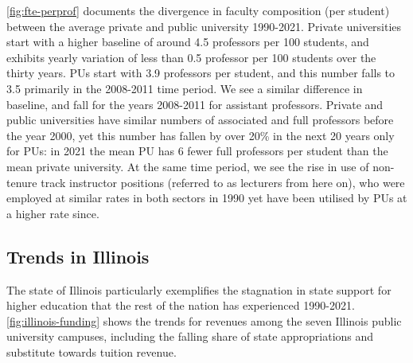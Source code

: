 \documentclass[notitlepage,12pt]{article}
\begin{document}
\autoref{fig:fte-perprof} documents the divergence in faculty composition (per student) between the average private and public university 1990-2021.
Private universities start with  a higher baseline of around 4.5 professors per 100 students, and exhibits yearly variation of less than 0.5 professor per 100 students over the thirty years.
PUs start with 3.9 professors per student, and this number falls to 3.5 primarily in the 2008-2011 time period.
We see a similar difference in baseline, and fall for the years 2008-2011 for assistant professors.
Private and public universities have similar numbers of associated and full professors before the year 2000, yet this number has fallen by over 20\% in the next 20 years only for PUs: in 2021 the mean PU has 6 fewer full professors per student than the mean private university.
At the same time period, we see the rise in use of non-tenure track instructor positions (referred to as lecturers from here on), who were employed at similar rates in both sectors in 1990 yet have been utilised by PUs at a higher rate since.

\subsection{Trends in Illinois}
\label{sec:trends-illinois}

The state of Illinois particularly exemplifies the stagnation in state support for higher education that the rest of the nation has experienced 1990-2021.
\autoref{fig:illinois-funding} shows the trends for revenues among the seven Illinois public university campuses, including the falling share of state appropriations and substitute towards tuition revenue.
\end{document}
